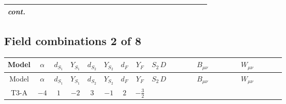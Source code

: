\documentclass[8pt]{article}
\begin{document}
\begin{landscape}
\begin{longtable}{@{}cccccccc >{\raggedright\arraybackslash}p{0.21\linewidth} >{\raggedright\arraybackslash}p{0.21\linewidth} >{\raggedright\arraybackslash}p{0.21\linewidth}@{}}
\textit{cont.} &  &  &  &  &  &  &  &  &  & \scriptsize\adjustbox{max width=\linewidth}{$\begin{gathered} -\frac{2 \hbar  \overline{y_{2,i_1,r_1}} S_{2,j_3} S_{2,j_4} y_{2,i_1,r_1} S_{2,j_1}{}^{\dagger } S_{2,j_2}{}^{\dagger } \mathcal{I}_{S_2,j_1,j_3,j_2,j_4}{}^2 \lambda_{S_2}^{(1)}^{(2)}}{\sqrt{3} \epsilon } \\ -\frac{\hbar  \overline{y_{2,i_1,r_1}} S_{2,j_3} S_{2,j_4} y_{2,i_1,r_1} S_{2,j_1}{}^{\dagger } S_{2,j_2}{}^{\dagger } \mathcal{I}_{S_2,j_1,j_3,j_2,j_4}{}^2 \lambda_{S_2}^{(1)}^{(2)}}{\sqrt{3}}\end{gathered}$} \\
\midrule
\bottomrule
\end{longtable}
\clearpage
\subsection*{Field combinations 2 of 8}
\begin{longtable}{@{}cccccccc >{\raggedright\arraybackslash}p{0.21\linewidth} >{\raggedright\arraybackslash}p{0.21\linewidth} >{\raggedright\arraybackslash}p{0.21\linewidth}@{}}
\toprule
Model & $\alpha$ & $d_{S_1}$ & $Y_{S_1}$ & $d_{S_2}$ & $Y_{S_2}$ & $d_F$ & $Y_F$ & $S_2\,D$ & $B_{\mu\nu}$ & $W_{\mu\nu}$ \\
\midrule
\endfirsthead
\toprule
Model & $\alpha$ & $d_{S_1}$ & $Y_{S_1}$ & $d_{S_2}$ & $Y_{S_2}$ & $d_F$ & $Y_F$ & $S_2\,D$ & $B_{\mu\nu}$ & $W_{\mu\nu}$ \\
\midrule
\endhead
T3-A & $-4$ & $1$ & $-2$ & $3$ & $-1$ & $2$ & $-\frac{3}{2}$ & \scriptsize\adjustbox{max width=\linewidth}{$\begin{gathered} +D_{\mu _1}\left(S_{2,j_1}\right){}^{\dagger } D_{\mu _1}\left(S_{2,j_1}\right)\end{gathered}$} & \scriptsize\adjustbox{max width=\linewidth}{$\begin{gathered} -\frac{9 \hbar  B_{\mu _1\mu _2}^2}{2 \epsilon }\end{gathered}$} & \scriptsize\adjustbox{max width=\linewidth}{$\begin{gathered} -\frac{\hbar  \left(W_{\mu _1\mu _2}^{A_1}\right){}^2}{2 \epsilon }\end{gathered}$} \\
\midrule
\bottomrule
\end{longtable}
\clearpage

\end{landscape}
\end{document}
